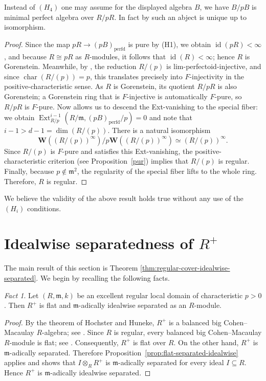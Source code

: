 \documentclass[12pt,reqno]{amsart}
\theoremstyle{definition}
\theoremstyle{remark}
\theoremstyle{cited}
\theoremstyle{remark}
\newtheorem{fact}[theorem]{Fact}
\theoremstyle{citeddef}
\newcommand{\W}{\textbf{W}}
\newcommand{\fm}{\mathfrak{m}}
\begin{document}
	
	Instead of $(H_4)$ one may assume for the displayed algebra $B$, we have $B/pB$ is minimal perfect algebra over
	$R/pR$. In fact by \cite[Proposition 3.12]{SZ}  such an abject is unique up to isomorphism.
	\begin{proof}
		Since the map $pR \to (pB)_{\mathrm{perfd}}$ is pure by (H1), we obtain $\operatorname{id}(pR) < \infty$, and because $R \cong pR$ as $R$-modules, it follows that $\operatorname{id}(R) < \infty$; hence $R$ is Gorenstein. Meanwhile, by \cite[Proposition~6.5]{ket}, the reduction $R/(p)$ is lim-perfectoid-injective, and since $\operatorname{char}(R/(p)) = p$, this translates precisely into $F$-injectivity in the positive-characteristic sense. As $R$ is Gorenstein, its quotient $R/pR$ is also Gorenstein; a Gorenstein ring that is $F$-injective is automatically $F$-pure, so $R/pR$ is $F$-pure. Now \cite[Theorem 10.77]{Rot} allows us to descend the Ext-vanishing to the special fiber: we obtain
		\(
		\operatorname{Ext}_{R/p}^{i-1}(R/\mathfrak{m}, (pB)_{\mathrm{perfd}}/p) = 0
		\)
		and note that $i-1 > d-1 = \dim(R/(p))$.  There is a natural isomorphism $$\W((R/(p))^\infty)/p\W((R/(p))^\infty)\simeq (R/(p))^\infty.$$ 
		Since $R/(p)$ is $F$-pure and satisfies this Ext-vanishing, the positive-characteristic criterion (see Proposition~\ref{pur}) implies that $R/(p)$ is regular. Finally, because $p \notin \mathfrak{m}^2$, the regularity of the special fiber lifts to the whole ring.  Therefore, $R$ is regular.
	\end{proof}
	
	We believe the validity of the above result holds true without any use of the $(H_i)$ conditions.
	
	
	
	\section{Idealwise separatedness of \texorpdfstring{$R^+$}{R+}}
	
	The main result of this section is 
	{Theorem} \ref{thm:regular-cover-idealwise-separated}.
	We begin by recalling the following facts.
	
	\begin{fact}\label{thm:regular-plus-idealwise-separated}
		Let $(R,\fm,k)$ be an excellent regular local domain of characteristic
		$p>0$. Then $R^+$ is flat and $\fm$-adically idealwise separated as an
		$R$-module.
	\end{fact}
	
	\begin{proof}
		By the theorem of Hochster and Huneke, $R^+$ is a balanced big
		Cohen--Macaulay $R$-algebra; see \cite{HH}. Since $R$ is regular,
		every balanced big Cohen--Macaulay $R$-module is flat; see
		\cite{Hoc83}.
		Consequently, $R^+$ is flat over $R$.
		On the other hand, $R^+$ is $\fm$-adically separated. Therefore
		Proposition~\ref{prop:flat-separated-idealwise} applies and shows that
		\(
		I\otimes_RR^+
		\)
		is $\fm$-adically separated for every ideal $I\subseteq R$. Hence
		$R^+$ is $\fm$-adically idealwise separated.
	\end{proof}
	
\end{document}
